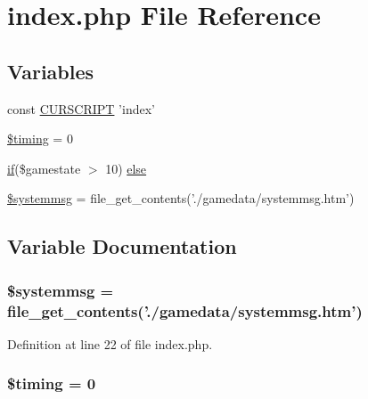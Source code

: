 \hypertarget{index_8php}{\section{index.\+php File Reference}
\label{index_8php}
}
\subsection*{Variables}
\begin{DoxyCompactItemize}
\item 
const \hyperlink{index_8php_a39c39f525eceb86cabc338804f230e80}{C\+U\+R\+S\+C\+R\+I\+P\+T} 'index'
\item 
\hyperlink{index_8php_a97244fa294e503a8466e58852d8834ae}{\$timing} = 0
\item 
\hyperlink{login__old_8php_a4ac1118c2e44c513a674bc1793ba6c90}{if}(\$gamestate $>$ 10) \hyperlink{index_8php_a15c453aad2aec18a240268ba90f07be0}{else}
\item 
\hyperlink{index_8php_a55ca8f809e3f66df41dedfdc9e85649e}{\$systemmsg} = file\+\_\+get\+\_\+contents('./gamedata/systemmsg.\+htm')
\end{DoxyCompactItemize}


\subsection{Variable Documentation}
\hypertarget{index_8php_a55ca8f809e3f66df41dedfdc9e85649e}{
\subsubsection[{\$systemmsg}]{\setlength{\rightskip}{0pt plus 5cm}\$systemmsg = file\+\_\+get\+\_\+contents('./gamedata/systemmsg.\+htm')}}\label{index_8php_a55ca8f809e3f66df41dedfdc9e85649e}


Definition at line 22 of file index.\+php.

\hypertarget{index_8php_a97244fa294e503a8466e58852d8834ae}{
\subsubsection[{\$timing}]{\setlength{\rightskip}{0pt plus 5cm}\$timing = 0}}\label{index_8php_a97244fa294e503a8466e58852d8834ae}


